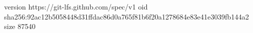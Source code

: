 version https://git-lfs.github.com/spec/v1
oid sha256:92ac12b5058448d31ffdac86d0a765f81b6f20a1278684e83e41e3039fb144a2
size 87540
